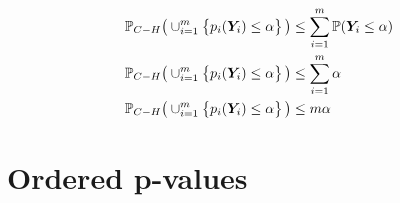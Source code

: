 \documentclass[a4paper,12pt]{article}
\begin{document}
\begin{align*}
\mathbb{P}_{C - H} \big( \cup_{i=1}^m \set{ p_i(\bm{Y}_i) \leq \alpha } \big) &\leq \sum_{i=1}^m \mathbb{P}(\bm{Y}_i \leq \alpha) \\
\mathbb{P}_{C - H} \big( \cup_{i=1}^m \set{ p_i(\bm{Y}_i) \leq \alpha } \big) &\leq \sum_{i=1}^m \alpha \\
\mathbb{P}_{C - H} \big( \cup_{i=1}^m \set{ p_i(\bm{Y}_i) \leq \alpha } \big) &\leq m\alpha \\
\end{align*}

\section{Ordered p-values}
\end{document}
